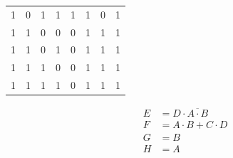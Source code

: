 \begin{table}[]
\begin{tabular}{|cc|cc|cc|cc|}
        1            & 0            & 1           & 1            & 1              & 1             & 0     & 1                          \\
        1            & 1            & 0           & 0            & 0              & 1             & 1     & 1                          \\
        1            & 1            & 0           & 1            & 0              & 1             & 1     & 1                          \\
        1            & 1            & 1           & 0            & 0              & 1             & 1     & 1                          \\
        1            & 1            & 1           & 1            & 0              & 1             & 1     & 1                          \\ \hline
    \end{tabular}
    \label{tab:03:FSM_truth_table}
\end{table}



\begin{equation}
\begin{split}
    E   &=  D \cdot \overline{A \cdot B}\\
    F   &=  A \cdot B + C \cdot D       \\
    G   &=  B                           \\
    H   &=  A
\end{split}
    \label{eq:03:boolean_equation}
\end{equation}

